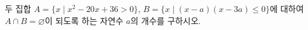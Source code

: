 두 집합 $A=\{x \mid x^2-20x+36>0\}$, $B=\{x \mid (x-a)(x-3a)\le 0\}$에 대하여 $A\cap B=\varnothing$이 되도록 하는 자연수 $a$의 개수를 구하시오.

